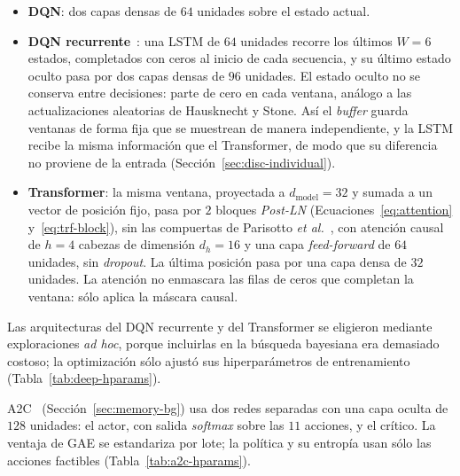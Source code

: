 \documentclass[../00_Main/Main.tex]{subfiles}
\begin{document}
\begin{itemize}
    \item \textbf{DQN}: dos capas densas de $64$ unidades sobre el estado
    actual.
    \item \textbf{DQN recurrente}~\citep{Hausknecht2015}: una LSTM de $64$
    unidades recorre los \'ultimos $W = 6$ estados,
    completados con ceros al inicio de cada secuencia, y su \'ultimo
    estado oculto pasa por dos capas densas de $96$ unidades. El estado
    oculto no se conserva entre decisiones: parte de cero en cada
    ventana, an\'alogo a las actualizaciones aleatorias de Hausknecht y Stone.
    As\'i el \emph{buffer} guarda ventanas de forma fija que se muestrean de
    manera independiente, y la LSTM recibe la misma informaci\'on que el
    Transformer, de modo que su diferencia no proviene de la entrada
    (Secci\'on~\ref{sec:disc-individual}).
    \item \textbf{Transformer}: la misma ventana, proyectada a
    $d_{\mathrm{model}} = 32$ y sumada a un vector de posici\'on fijo, pasa    por $2$ bloques \emph{Post-LN} (Ecuaciones~\eqref{eq:attention}
    y~\eqref{eq:trf-block}), sin las compuertas de Parisotto
    \emph{et al.}~\citep{Parisotto2020}, con atenci\'on causal de $h = 4$
    cabezas de dimensi\'on $d_h = 16$ y una capa \emph{feed-forward} de
    $64$ unidades, sin \emph{dropout}. La \'ultima posici\'on pasa por una
    capa densa de $32$ unidades. La atenci\'on no
    enmascara las filas de ceros que completan la ventana: s\'olo aplica
    la m\'ascara causal.
\end{itemize}

Las arquitecturas del DQN recurrente y del Transformer se eligieron
mediante exploraciones \emph{ad hoc}, porque incluirlas en la b\'usqueda
bayesiana era demasiado costoso; la optimizaci\'on s\'olo ajust\'o sus
hiperpar\'ametros de entrenamiento
(Tabla~\ref{tab:deep-hparams}).

A2C~\citep{Mnih2016} (Secci\'on~\ref{sec:memory-bg}) usa dos redes
separadas con una capa oculta de $128$ unidades: el actor, con salida
\emph{softmax} sobre las $11$ acciones, y el cr\'itico. La ventaja de GAE
se estandariza por lote; la pol\'itica y su entrop\'ia usan s\'olo las
acciones factibles (Tabla~\ref{tab:a2c-hparams}).
\end{document}
